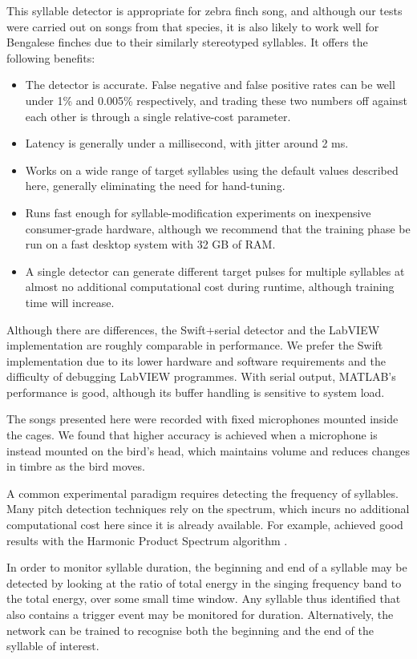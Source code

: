 \documentclass[10pt,letterpaper]{article}
\begin{document}
This syllable detector is appropriate for zebra finch song, and
although our tests were carried out on songs from that species, it is
also likely to work well for Bengalese finches due to their similarly stereotyped syllables.  It offers the
following benefits:
\begin{itemize}
\item The detector is accurate. False negative and false positive
  rates can be well under 1\% and 0.005\% respectively, and trading
  these two numbers off against each other is through a single
  relative-cost parameter.
\item Latency is generally under a millisecond, with jitter around 2
  ms.
\item Works on a wide range of target syllables using the default
  values described here, generally eliminating the need for
  hand-tuning.
\item Runs fast enough for syllable-modification experiments on
  inexpensive consumer-grade hardware, although we recommend that the
  training phase be run on a fast desktop system with 32 GB of RAM.
\item A single detector can generate different target pulses for
  multiple syllables at almost no additional computational cost during
  runtime, although training time will increase.
\end{itemize}

Although there are differences, the Swift+serial detector and the
LabVIEW implementation are roughly comparable in performance.  We
prefer the Swift implementation due to its lower hardware and software
requirements and the difficulty of debugging LabVIEW programmes.  With
serial output, MATLAB's performance is good, although its buffer
handling is sensitive to system load.

The songs presented here were recorded with fixed microphones mounted
inside the cages.  We found that higher accuracy is achieved when a
microphone is instead mounted on the bird's head, which maintains
volume and reduces changes in timbre as the bird moves.

A common experimental paradigm requires detecting the frequency of
syllables.  Many pitch detection techniques rely on the spectrum,
which incurs no additional computational cost here since it is already
available.  For example, \cite{Canopoli2014} achieved good results
with the Harmonic Product Spectrum algorithm
\cite{Noll1970pitchdetection}.

In order to monitor syllable duration, the beginning and end of a
syllable may be detected by looking at the ratio of total energy in
the singing frequency band to the total energy, over some small time
window.  Any syllable thus identified that also contains a trigger
event may be monitored for duration.  Alternatively, the network can
be trained to recognise both the beginning and the end of the syllable
of interest.
\end{document}
